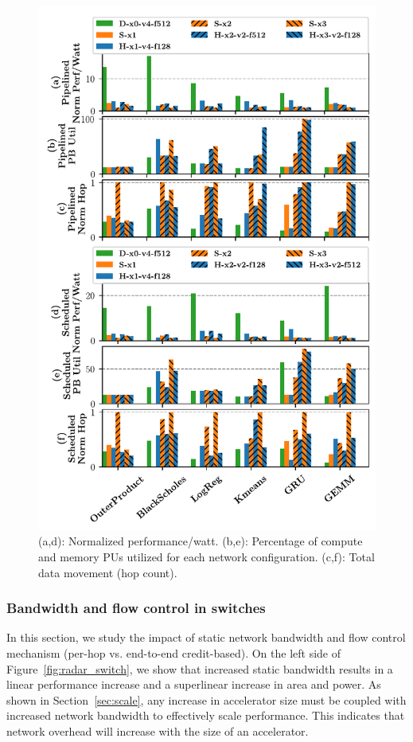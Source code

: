 \begin{figure}
\centering
  \includegraphics[width=0.8\columnwidth]{figs/energy.pdf} 
\caption{(a,d): Normalized performance/watt. (b,e): Percentage of compute and memory PUs utilized for each network configuration. 
  (c,f): Total data movement (hop count).}
\label{fig:energy}
\end{figure}

\subsubsection{Bandwidth and flow control in switches}

In this section, we study the impact of static network bandwidth and flow control mechanism (per-hop vs. end-to-end credit-based). 
On the left side of Figure~\ref{fig:radar_switch}, we show that increased static bandwidth results in a linear performance increase and a superlinear increase in area and power. 
As shown in Section~\ref{sec:scale}, any increase in accelerator size must be coupled with increased network bandwidth to effectively scale performance. 
This indicates that network overhead will increase with the size of an accelerator.

